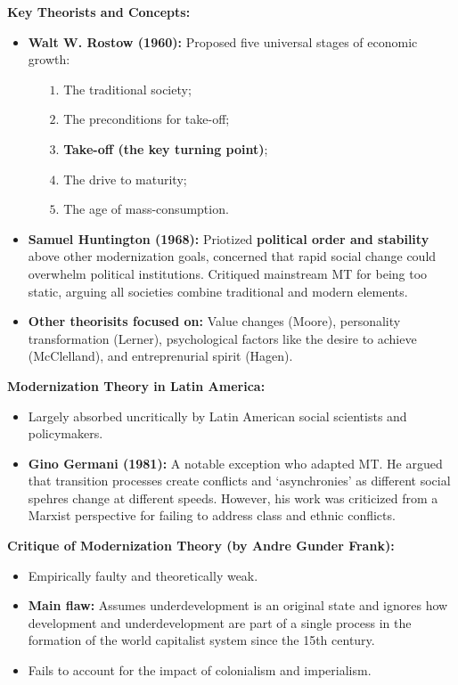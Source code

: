 \documentclass{article}
\begin{document}
    \noindent \textbf{Key Theorists and Concepts:}
    \begin{itemize}
        \item \textbf{Walt W. Rostow (1960):} Proposed five universal stages
        of economic growth:
        \begin{itemize}
            \item [$1$.] The traditional society;
            \item[$2$.] The preconditions for take-off;
            \item[$3$.] \textbf{Take-off (the key turning point)};
            \item[$4$.] The drive to maturity;
            \item[$5$.] The age of mass-consumption.
        \end{itemize}
        \item \textbf{Samuel Huntington (1968):} Priotized
        \textbf{political order and stability} above other modernization
        goals, concerned that rapid social change could overwhelm political
        institutions. Critiqued mainstream MT for being too static, arguing
        all societies combine traditional and modern elements.
        \item \textbf{Other theorisits focused on:} Value changes (Moore),
        personality transformation (Lerner), psychological factors like the
        desire to achieve (McClelland), and entreprenurial spirit (Hagen).
    \end{itemize}

    \noindent \textbf{Modernization Theory in Latin America:}
    \begin{itemize}
        \item Largely absorbed uncritically by Latin American social
        scientists and policymakers.
        \item \textbf{Gino Germani (1981):} A notable exception who adapted
        MT. He argued that transition processes create conflicts and
        `asynchronies' as different social spehres change at different
        speeds. However, his work was criticized from a Marxist perspective
        for failing to address class and ethnic conflicts.
    \end{itemize}

    \noindent \textbf{Critique of Modernization Theory (by Andre Gunder Frank):}
    \begin{itemize}
        \item Empirically faulty and theoretically weak.
        \item \textbf{Main flaw:} Assumes underdevelopment is an original
        state and ignores how development and underdevelopment are part of a
        single process in the formation of the world capitalist system since
        the 15th century.
        \item Fails to account for the impact of colonialism and imperialism.
    \end{itemize}
\end{document}
